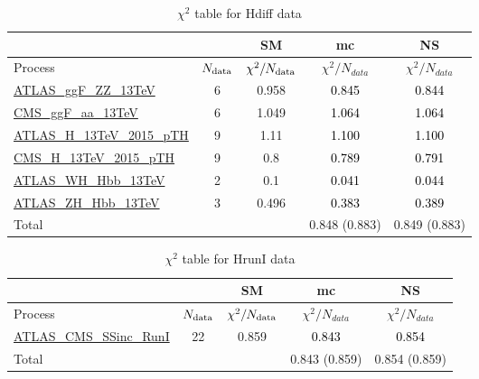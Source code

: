\documentclass{article}
\begin{document}
\begin{table}[H]
\centering
\begin{tabular}{|l|c|c|c|c|}
\hline
 \multicolumn{2}{|c|}{} & SM& mc& NS\\ \hline
Process & $N_{\rm data}$ & $\chi^ 2/N_{\rm data}$& $\chi^ 2/N_{data}$& $\chi^ 2/N_{data}$\\ \hline
\href{https://arxiv.org/abs/1909.02845}{ATLAS_ggF_ZZ_13TeV} & 6 & 0.958 & \textcolor{black}{0.845} & \textcolor{black}{0.844} \\ \hline
\href{https://inspirehep.net/literature/1725274}{CMS_ggF_aa_13TeV} & 6 & 1.049 & \textcolor{black}{1.064} & \textcolor{black}{1.064} \\ \hline
\href{https://inspirehep.net/literature/1743896}{ATLAS_H_13TeV_2015_pTH} & 9 & 1.11 & \textcolor{black}{1.100} & \textcolor{black}{1.100} \\ \hline
\href{https://arxiv.org/abs/1812.06504}{CMS_H_13TeV_2015_pTH} & 9 & 0.8 & \textcolor{black}{0.789} & \textcolor{black}{0.791} \\ \hline
\href{https://arxiv.org/abs/1903.04618}{ATLAS_WH_Hbb_13TeV} & 2 & 0.1 & \textcolor{black}{0.041} & \textcolor{black}{0.044} \\ \hline
\href{https://arxiv.org/abs/1903.04618}{ATLAS_ZH_Hbb_13TeV} & 3 & 0.496 & \textcolor{black}{0.383} & \textcolor{black}{0.389} \\ \hline
\hline Total & &  & 0.848 (0.883) & 0.849 (0.883) \\ \hline
\end{tabular}
\caption{$\chi^2$ table for Hdiff data}
\end{table}
\begin{table}[H]
\centering
\begin{tabular}{|l|c|c|c|c|}
\hline
 \multicolumn{2}{|c|}{} & SM& mc& NS\\ \hline
Process & $N_{\rm data}$ & $\chi^ 2/N_{\rm data}$& $\chi^ 2/N_{data}$& $\chi^ 2/N_{data}$\\ \hline
\href{https://arxiv.org/abs/1606.02266}{ATLAS_CMS_SSinc_RunI} & 22 & 0.859 & \textcolor{black}{0.843} & \textcolor{black}{0.854} \\ \hline
\hline Total & &  & 0.843 (0.859) & 0.854 (0.859) \\ \hline
\end{tabular}
\caption{$\chi^2$ table for HrunI data}
\end{table}
\end{document}
